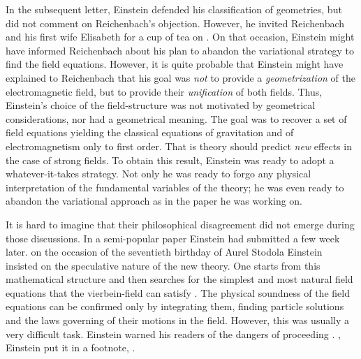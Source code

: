 \documentclass[draft]{article}
\newcommand{\vbein}{vierbein\xspace}
\begin{document}
In the subsequent letter, Einstein defended his classification of geometries, but did not comment on Reichenbach's objection. However, he invited Reichenbach and his first wife Elisabeth for a cup of tea on . On that occasion, Einstein might have informed Reichenbach about his plan to abandon the variational strategy to find the field equations. However, it is quite probable that Einstein might have explained to Reichenbach that his goal was \emph{not} to provide a \emph{geometrization} of the electromagnetic field, but to provide their \emph{unification} of both fields. Thus, Einstein's choice of the field-structure was not motivated by geometrical considerations, nor had a geometrical meaning. The goal was to recover a set of field equations yielding the classical equations of gravitation and of electromagnetism only to first order. That is theory should predict \emph{new} effects in the case of strong fields. To obtain this result, Einstein was ready to adopt a whatever-it-takes strategy. Not only  he was ready to forgo any physical interpretation of the fundamental variables of the theory; he was even ready to abandon the variational approach as in the paper he was working on. 

It is hard to imagine that their philosophical disagreement did not emerge during those discussions. In a semi-popular paper Einstein had submitted a few week later.  on the occasion of the seventieth birthday of Aurel Stodola\label{stodola} Einstein insisted on the speculative nature of the new theory.  One starts from this mathematical structure and then searches for the simplest and most natural field equations that the \vbein-field can satisfy \citep[131]{Einstein1929}. The physical soundness of the field equations can be confirmed only by integrating them, finding particle solutions and the laws governing of their motions in the field. However, this was usually a very difficult task. Einstein warned his readers of the dangers of proceeding  \citep[127]{Einstein1929}. , Einstein put it in a footnote,  \citep[127]{Einstein1929}.


\end{document}
